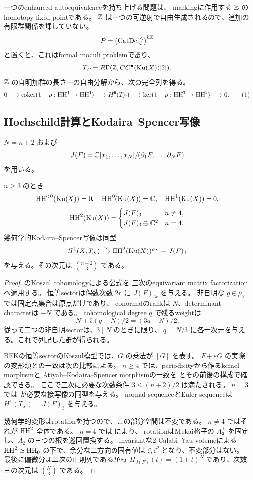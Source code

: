 一つのenhanced autoequivalenceを持ち上げる問題は、
markingに作用する \(\mathbb Z\) のhomotopy fixed pointである。
\(\mathbb Z\) は一つの可逆射で自由生成されるので、追加の有限群関係を課していない。
\[
 P=\left(\operatorname{CatDef}_{\mathcal C}^{\wedge}\right)^{h\mathbb Z}
\]
と置くと、これはformal moduli problemであり、
\[
 T_P=R\Gamma(\mathbb Z,CC^\bullet(\operatorname{Ku}(X))[2]).
\]
\(\mathbb Z\) の自明加群の長さ一の自由分解から、次の完全列を得る。
\[
 0\longrightarrow
 \operatorname{coker}(1-\rho:\operatorname{HH}^1\to\operatorname{HH}^1)
 \longrightarrow H^0(T_P)
 \longrightarrow
 \ker(1-\rho:\operatorname{HH}^2\to\operatorname{HH}^2)
 \longrightarrow0.                                      \tag{1}\label{eq:tangent}
\]

\subsection{Hochschild計算とKodaira--Spencer写像}

\(N=n+2\) および
\[
 J(F)=\mathbb C[x_1,\ldots,x_N]/(\partial_1F,\ldots,\partial_NF)
\]
を用いる。

\begin{lemma}\label{lem:HH}
 \(n\ge3\) のとき
 \[
 \operatorname{HH}^{<0}(\operatorname{Ku}(X))=0,\quad \operatorname{HH}^0(\operatorname{Ku}(X))=\mathbb C,\quad
 \operatorname{HH}^1(\operatorname{Ku}(X))=0,
 \]
 \[
 \operatorname{HH}^2(\operatorname{Ku}(X))=
 \begin{cases}
 J(F)_3& n\ne4,\\
 J(F)_3\oplus\mathbb C^2& n=4.
 \end{cases}
 \]
 幾何学的Kodaira--Spencer写像は同型
 \[
 H^1(X,T_X)\xrightarrow{\sim}
 \operatorname{HH}^2(\operatorname{Ku}(X))^{\rho_X}=J(F)_3
 \]
 を与える。その次元は \(\binom{n+2}{3}\) である。
\end{lemma}
\begin{proof}
 \cite[Theorem 5.39]{BFK} のKoszul cohomologyによる公式を
 三次のequivariant matrix factorizationへ適用する。
 恒等sectorは偶数次数 \(2r\) に \(J(F)_{3r}\) を与える。
 非自明な \(g\in\mu_3\) では固定点集合は原点だけであり、
 conormalのrankは \(N\)、determinant characterは \(-N\) である。
 cohomological degree \(q\) で残るweightは
 \[
 N+3(q-N)/2=(3q-N)/2.
 \]
 従って二つの非自明sectorは、\(3\mid N\) のときに限り、
 \(q=N/3\) に各一次元を与える。これで列記した群が得られる。

 BFKの恒等sectorのKoszul模型では、\(G\) の乗法が \([G]\) を表す。
 \(F+\varepsilon G\) の実際の変形類との一致は次の比較による。
 \(n\ge4\) では、periodicityから作るkernel morphismと
 Atiyah--Kodaira--Spencer morphismの一致を
 \cite[Lemma 2.19]{HR} とその前後の構成で確認できる。
 ここで三次に必要な次数条件 \(3\le(n+2)/2\) は満たされる。
 \(n=3\) では \cite[Theorem 4.4(2)]{JLLZ} が必要な接写像の同型を与える。
 normal sequenceとEuler sequenceは \(H^1(T_X)=J(F)_3\) を与える。

 幾何学的変形はrotationを持つので、この部分空間は不変である。
 \(n\ne4\) ではそれが \(\operatorname{HH}^2\) 全体である。
 \(n=4\) では \cite[Proposition 3.12]{Huy} により、
 rotationはMukai格子の \(A_2^\perp\) を固定し、\(A_2\) の三つの根を巡回置換する。
 invariantな2-Calabi--Yau volumeによる
 \(\operatorname{HH}^2\simeq\operatorname{HH}_0\) の下で、余分な二方向の固有値は
 \(\zeta,\zeta^2\) となり、不変部分はない。
 最後に偏微分は二次の正則列であるから
 \(H_{J(F)}(t)=(1+t)^N\) であり、次数三の次元は \(\binom N3\) である。
\end{proof}

